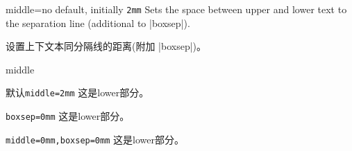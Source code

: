 \begin{docTcbKey}{middle}{=}{no default, initially \texttt{2mm}}
Sets the space between upper and lower text to the separation line
(additional to |boxsep|).


设置上下文本同分隔线的距离(附加 |boxsep|)。
\begin{exdispExample}{middle}

\begin{tcolorbox}
默认\verb|middle=2mm|
\tcblower
这是lower部分。
\end{tcolorbox}
\begin{tcolorbox}[boxsep=0mm]
\verb|boxsep=0mm|
\tcblower
这是lower部分。
\end{tcolorbox}
\begin{tcolorbox}[middle=0mm,boxsep=0mm]
\verb|middle=0mm,boxsep=0mm|
\tcblower
这是lower部分。
\end{tcolorbox}


\end{exdispExample}
\end{docTcbKey}


